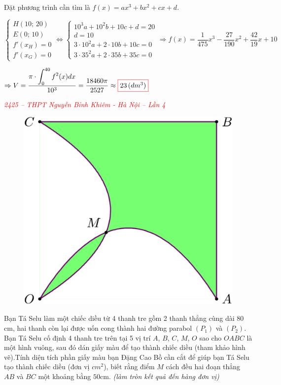 \documentclass[twoside,final]{hcmut-report}
\newcommand{\exercise}[1]{\begin{exercisebox}#1\end{exercisebox}}
\newcommand{\result}[1]{\fcolorbox{red}{white}{#1}}
\begin{document}
Đặt phương trình cần tìm là $f(x)=ax^3+bx^2+cx+d$.\par
$\begin{cases}
        H(10;\,20) \\ E(0;\,10) \\ f'(x_H) = 0 \\ f'(x_G) = 0
    \end{cases}
    \Leftrightarrow
    \begin{cases}
        10^3a + 10^2b+10c+d = 20            \\
        d=10                                \\
        3\cdot 10^2a + 2\cdot 10b + 10c = 0 \\
        3\cdot 35^2a + 2\cdot 35b + 35c = 0
    \end{cases}
    \Rightarrow f(x) = \dfrac{1}{475}x^3 - \dfrac{27}{190}x^2 + \dfrac{42}{19}x + 10
$\par
$\Rightarrow V = \dfrac{\displaystyle \pi\cdot\int_{0}^{40}f^2(x)dx}{10^3} = \dfrac{18460\pi}{2527} \approx \result{$23\, (dm^3)$}$
\exercise{
    \textcolor{red}{\textit{2425 -- THPT Nguyễn Bỉnh Khiêm - Hà Nội -- Lần 4}}

    \begin{figure}
        \centering
        \includegraphics[width=1\linewidth]{images/Ứng dụng tích phân/NBK-4.png}
    \end{figure}

    Bạn Tá Selu làm một chiếc diều từ 4 thanh tre gồm 2 thanh thẳng cùng dài $80$cm, hai thanh còn lại được uốn cong thành hai đường parabol $(P_1)$ và $(P_2)$. Bạn Tá Selu cố định 4 thanh tre trên tại 5 vị trí $A$, $B$, $C$, $M$, $O$ sao cho $OABC$ là một hình vuông, sau đó dán giấy màu để tạo thành chiếc diều (tham khảo hình vẽ).Tính diện tích phần giấy màu bạn Đặng Cao Bồ cần cắt để giúp bạn Tá Selu tạo thành chiếc diều (đơn vị $cm^2$), biết rằng điểm $M$ cách đều hai đoạn thẳng $AB$ và $BC$ một khoảng bằng $50$cm. \textit{(làm tròn kết quả đến hàng đơn vị)}
}
\end{document}
